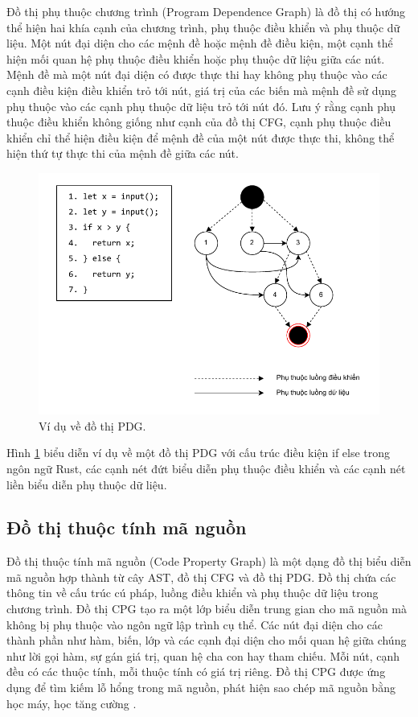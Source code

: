 Đồ thị phụ thuộc chương trình (Program Dependence Graph) \cite{ferrante1987program} là đồ thị có hướng thể hiện hai khía cạnh của chương trình, phụ thuộc điều khiển và phụ thuộc dữ liệu.
Một nút đại diện cho các mệnh đề hoặc mệnh đề điều kiện, một cạnh thể hiện mối quan hệ phụ thuộc điều khiển hoặc phụ thuộc dữ liệu giữa các nút.
Mệnh đề mà một nút đại diện có được thực thi hay không phụ thuộc vào các cạnh điều kiện điều khiển trỏ tới nút, giá trị của các biến mà mệnh đề sử dụng phụ thuộc vào các cạnh phụ thuộc dữ liệu trỏ tới nút đó.
Lưu ý rằng cạnh phụ thuộc điều khiển không giống như cạnh của đồ thị CFG, cạnh phụ thuộc điều khiển chỉ thể hiện điều kiện để mệnh đề của một nút được thực thi, không thể hiện thứ tự thực thi của mệnh đề giữa các nút.

\begin{figure}[H]
  \includegraphics[width=1\columnwidth]{figures/c2/c2_pdg.drawio.pdf}
  \centering
  \caption{Ví dụ về đồ thị PDG.}
  \label{img:c2_pdg}
\end{figure}

Hình \ref{img:c2_pdg} biểu diễn ví dụ về một đồ thị PDG với cấu trúc điều kiện if else trong ngôn ngữ Rust, các cạnh nét đứt biểu diễn phụ thuộc điều khiển và các cạnh nét liền biểu diễn phụ thuộc dữ liệu.

\subsection{Đồ thị thuộc tính mã nguồn}

Đồ thị thuộc tính mã nguồn (Code Property Graph) \cite{yamaguchi2014modeling} là một dạng đồ thị biểu diễn mã nguồn hợp thành từ cây AST, đồ thị CFG và đồ thị PDG.
Đồ thị chứa các thông tin về cấu trúc cú pháp, luồng điều khiển và phụ thuộc dữ liệu trong chương trình. Đồ thị CPG tạo ra một lớp biểu diễn trung gian cho mã nguồn mà không bị phụ thuộc vào ngôn ngữ lập trình cụ thể.
Các nút đại diện cho các thành phần như hàm, biến, lớp và các cạnh đại diện cho mối quan hệ giữa chúng như lời gọi hàm, sự gán giá trị, quan hệ cha con hay tham chiếu.
Mỗi nút, cạnh đều có các thuộc tính, mỗi thuộc tính có giá trị riêng.
Đồ thị CPG được ứng dụng để tìm kiếm lỗ hổng trong mã nguồn, phát hiện sao chép mã nguồn bằng học máy, học tăng cường \cite{xiaomeng2018cpgva, han2023bjxnet}.

